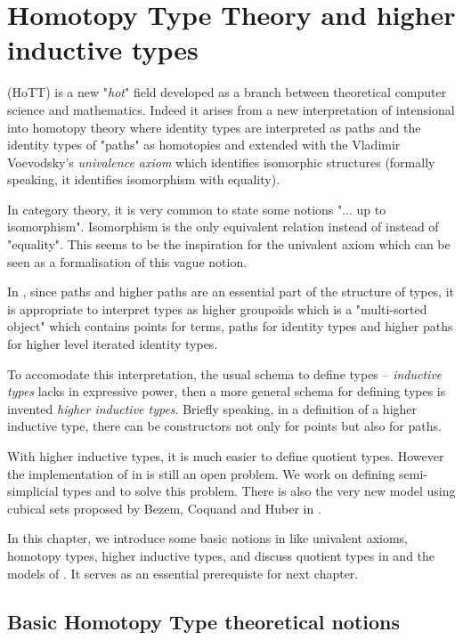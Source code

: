 \chapter{Homotopy Type Theory and higher inductive types}\label{HITs}


\hott (HoTT) is a new "\emph{hot}" field developed as a
branch between theoretical computer science
and mathematics. Indeed it arises from a new interpretation of intensional \mltt
into homotopy theory where identity types are interpreted as paths and
the identity types of "paths" as homotopies and extended with the Vladimir Voevodsky's \emph{univalence axiom} which identifies isomorphic
structures (formally speaking, it identifies isomorphism with
equality).

In category theory, it is very common to state some notions "... up to
isomorphism". Isomorphism is the only equivalent relation instead of
instead of "equality". This seems to be the inspiration for the
univalent axiom which can be seen as a formalisation of this vague notion.

In \hott, since paths and higher paths are an essential part of the
structure of types,  it is appropriate to interpret types as higher groupoids
which is a "multi-sorted object" which contains points for terms,
paths for identity types and higher paths for higher level iterated identity
types\cite{hott-online}. 

To accomodate this interpretation, the usual schema to define types --
\emph{inductive
types} lacks in expressive power, then a more
general schema for defining types is invented \textemdash \emph{higher
inductive types}. Briefly speaking, in a definition of a higher inductive type, there can
be constructors not only for points but also for paths.

With higher inductive types, it is much easier to define quotient
types. However the implementation of \hott in \itt is still an open problem. We
work on defining semi-simplicial types and \wog to solve this problem. There
is also the very new model using cubical sets proposed by Bezem,
Coquand and Huber in \cite{bezem2013model}.

In this chapter, we introduce some basic notions in \hott like
univalent axioms, homotopy types,
higher inductive types, and discuss quotient types in \hott and the
models of \hott. It serves as an essential prerequiste for next chapter.


\section{Basic Homotopy Type theoretical notions}

